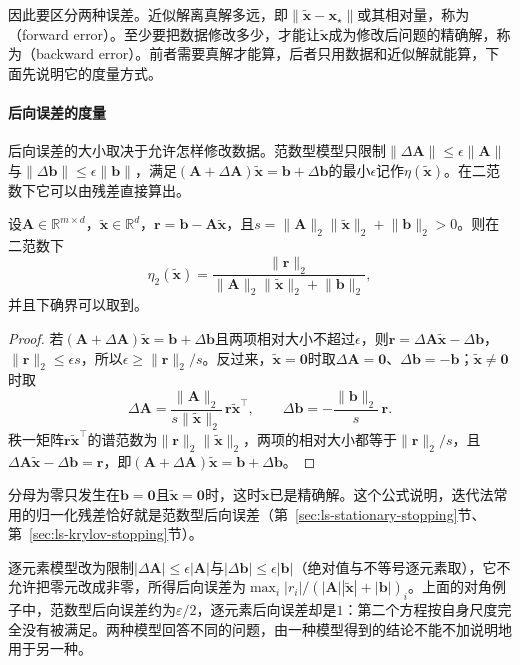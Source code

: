 因此要区分两种误差。近似解离真解多远，即$\lVert\tilde{\bm x}-\bm x_\star\rVert$或其相对量，称为（forward error）。至少要把数据修改多少，才能让$\tilde{\bm x}$成为修改后问题的精确解，称为（backward error）。前者需要真解才能算，后者只用数据和近似解就能算，下面先说明它的度量方式。

\paragraph{后向误差的度量}
后向误差的大小取决于允许怎样修改数据。范数型模型只限制$\lVert\Delta\bm A\rVert\leq\epsilon\lVert\bm A\rVert$与$\lVert\Delta\bm b\rVert\leq\epsilon\lVert\bm b\rVert$，满足$(\bm A+\Delta\bm A)\tilde{\bm x}=\bm b+\Delta\bm b$的最小$\epsilon$记作$\eta(\tilde{\bm x})$。在二范数下它可以由残差直接算出。

\begin{theorem}[范数型后向误差]
\label{thm:ls-backward-error-formulas}
设$\bm A\in\mathbb R^{m\times d}$，$\tilde{\bm x}\in\mathbb R^d$，$\bm r=\bm b-\bm A\tilde{\bm x}$，且$s=\lVert\bm A\rVert_2\lVert\tilde{\bm x}\rVert_2+\lVert\bm b\rVert_2>0$。则在二范数下
\[
 \eta_2(\tilde{\bm x})=\frac{\lVert\bm r\rVert_2}{\lVert\bm A\rVert_2\lVert\tilde{\bm x}\rVert_2+\lVert\bm b\rVert_2},
\]
并且下确界可以取到。
\end{theorem}
\begin{proof}
若$(\bm A+\Delta\bm A)\tilde{\bm x}=\bm b+\Delta\bm b$且两项相对大小不超过$\epsilon$，则$\bm r=\Delta\bm A\tilde{\bm x}-\Delta\bm b$，$\lVert\bm r\rVert_2\leq\epsilon s$，所以$\epsilon\geq\lVert\bm r\rVert_2/s$。反过来，$\tilde{\bm x}=\bm0$时取$\Delta\bm A=\bm0$、$\Delta\bm b=-\bm b$；$\tilde{\bm x}\ne\bm0$时取
\[
 \Delta\bm A=\frac{\lVert\bm A\rVert_2}{s\lVert\tilde{\bm x}\rVert_2}\,\bm r\tilde{\bm x}^\top,\qquad
 \Delta\bm b=-\frac{\lVert\bm b\rVert_2}{s}\,\bm r .
\]
秩一矩阵$\bm r\tilde{\bm x}^\top$的谱范数为$\lVert\bm r\rVert_2\lVert\tilde{\bm x}\rVert_2$，两项的相对大小都等于$\lVert\bm r\rVert_2/s$，且$\Delta\bm A\tilde{\bm x}-\Delta\bm b=\bm r$，即$(\bm A+\Delta\bm A)\tilde{\bm x}=\bm b+\Delta\bm b$。
\end{proof}

分母为零只发生在$\bm b=\bm0$且$\tilde{\bm x}=\bm0$时，这时$\tilde{\bm x}$已是精确解。这个公式说明，迭代法常用的归一化残差恰好就是范数型后向误差（第~\ref{sec:ls-stationary-stopping}节、第~\ref{sec:ls-krylov-stopping}节）。

逐元素模型改为限制$|\Delta\bm A|\leq\epsilon|\bm A|$与$|\Delta\bm b|\leq\epsilon|\bm b|$（绝对值与不等号逐元素取），它不允许把零元改成非零，所得后向误差为$\max_i|r_i|/(|\bm A||\tilde{\bm x}|+|\bm b|)_i$。上面的对角例子中，范数型后向误差约为$\varepsilon/2$，逐元素后向误差却是$1$：第二个方程按自身尺度完全没有被满足。两种模型回答不同的问题，由一种模型得到的结论不能不加说明地用于另一种。

